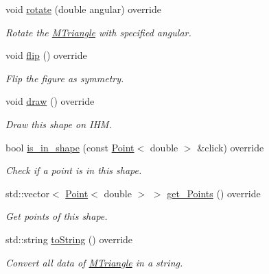\begin{DoxyCompactItemize}
void \hyperlink{classMTriangle_a4be29553eeddf99c367b1ec220bc102b}{rotate} (double angular) override
\begin{DoxyCompactList}\small\item\em Rotate the \hyperlink{classMTriangle}{M\+Triangle} with specified angular. \end{DoxyCompactList}\item 
\mbox{\label{classMTriangle_a6258b96b57c1892098f84a5a5fa0f976}} 
void \hyperlink{classMTriangle_a6258b96b57c1892098f84a5a5fa0f976}{flip} () override
\begin{DoxyCompactList}\small\item\em Flip the figure as symmetry. \end{DoxyCompactList}\item 
\mbox{\label{classMTriangle_a7801818e2188f39ba89a2a82df8fa5fe}} 
void \hyperlink{classMTriangle_a7801818e2188f39ba89a2a82df8fa5fe}{draw} () override
\begin{DoxyCompactList}\small\item\em Draw this shape on I\+HM. \end{DoxyCompactList}\item 
bool \hyperlink{classMTriangle_a4cc4cd63537ead67a0b68d1ab25111b4}{is\+\_\+in\+\_\+shape} (const \hyperlink{classPoint}{Point}$<$ double $>$ \&click) override
\begin{DoxyCompactList}\small\item\em Check if a point is in this shape. \end{DoxyCompactList}\item 
std\+::vector$<$ \hyperlink{classPoint}{Point}$<$ double $>$ $>$ \hyperlink{classMTriangle_a90351a097a20d35f9d6c4d05ad881e48}{get\+\_\+\+Points} () override
\begin{DoxyCompactList}\small\item\em Get points of this shape. \end{DoxyCompactList}\item 
std\+::string \hyperlink{classMTriangle_a7d1fd825592dffa6ac05b3398a8c105a}{to\+String} () override
\begin{DoxyCompactList}\small\item\em Convert all data of \hyperlink{classMTriangle}{M\+Triangle} in a string. \end{DoxyCompactList}\end{DoxyCompactItemize}


